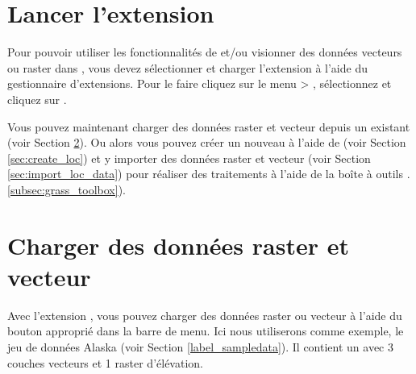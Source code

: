 \section{Lancer l'extension \grass}\label{sec:starting_grass}


Pour pouvoir utiliser les fonctionnalités de \grass et/ou visionner des données vecteurs ou raster dans \qg, 
vous devez sélectionner et charger l'extension \grass à l'aide du gestionnaire d'extensions. 
Pour le faire cliquez sur le menu  > , 
sélectionnez \dropmenuopt{\grass} et cliquez sur .


Vous pouvez maintenant charger des données raster et vecteur depuis un  \grass existant (voir Section \ref{sec:load_grassdata}). Ou alors vous pouvez créer un nouveau  \grass à l'aide de \qg (voir Section \ref{sec:create_loc}) et y importer des données raster et vecteur (voir Section \ref{sec:import_loc_data}) pour réaliser des traitements à l'aide de la boîte à outils \grass.\ref{subsec:grass_toolbox}).

\section{Charger des données \grass raster et vecteur}\label{sec:load_grassdata}

Avec l'extension \grass, vous pouvez charger des données raster ou vecteur à l'aide  du bouton approprié dans la barre de menu. Ici nous utiliserons comme exemple,  le jeu de données \qg Alaska (voir Section \ref{label_sampledata}).  Il contient un  \grass avec 3 couches vecteurs et 1 raster d'élévation.

